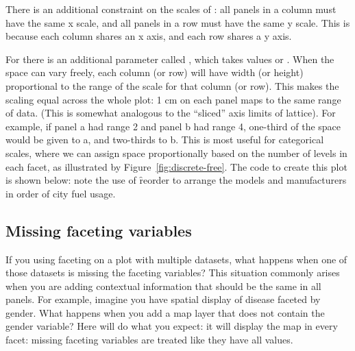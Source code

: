 There is an additional constraint on the scales of : all panels in a column must have the same x scale, and all panels in a row must have the same y scale.  This is because each column shares an x axis, and each row shares a y axis.

For  there is an additional parameter called , which takes values  or .  When the space can vary freely, each column (or row) will have width (or height) proportional to the range of the scale for that column (or row).  This makes the scaling equal across the whole plot: 1 cm on each panel maps to the same range of data.  (This is somewhat analogous to the ``sliced'' axis limits of lattice).  For example, if panel a had range 2 and panel b had range 4, one-third of the space would be given to a, and two-thirds to b.  This is most useful for categorical scales, where we can assign space proportionally based on the number of levels in each facet, as illustrated by Figure~\ref{fig:discrete-free}.  The code to create this plot is shown below: note the use of \f{reorder} to arrange the models and manufacturers in order of city fuel usage.

% 
%


\subsection{Missing faceting variables}
\label{sub:missing_faceting_columns}

If you using faceting on a plot with multiple datasets, what happens when one of those datasets is missing the faceting variables? This situation commonly arises when you are adding contextual information that should be the same in all panels. For example, imagine you have spatial display of disease faceted by gender. What happens when you add a map layer that does not contain the gender variable?  Here \ggplot will do what you expect: it will display the map in every facet: missing faceting variables are treated like they have all values.

